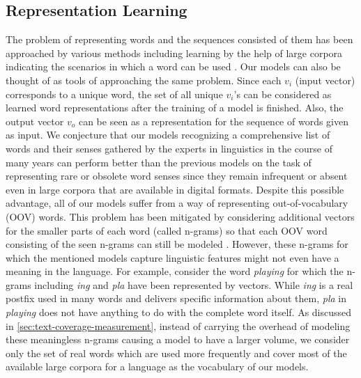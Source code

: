 \documentclass{article}
\begin{document}
\subsection{Representation Learning}
The problem of representing words and the sequences consisted of them has been approached by various methods including learning by the help of large corpora indicating the scenarios in which a word can be used \cite{Mikolov2013EfficientEO}. Our models can also be thought of as tools of approaching the same problem.
Since each $v_i$ (input vector) corresponds to a unique word, the set of all unique $v_i$'s can be considered as learned word representations after the training of a model is finished.
Also, the output vector $v_o$ can be seen as a representation for the sequence of words given as input.
We conjecture that our models recognizing a comprehensive list of words and their senses gathered by the experts in linguistics in the course of many years can perform better than the previous models on the task of representing rare or obsolete word senses since they remain infrequent or absent even in large corpora that are available in digital formats. Despite this possible advantage, all of our models suffer from a way of representing out-of-vocabulary (OOV) words. This problem has been mitigated by considering additional vectors for the smaller parts of each word (called n-grams) so that each OOV word consisting of the seen n-grams can still be modeled \cite{bojanowski-etal-2017-enriching,peters-etal-2018-deep,devlin-etal-2019-bert}. However, these n-grams for which the mentioned models capture linguistic features might not even have a meaning in the language. For example, consider the word \textit{playing} for which the n-grams including \textit{ing} and \textit{pla} have been represented by vectors. While \textit{ing} is a real postfix used in many words and delivers specific information about them, \textit{pla} in \textit{playing} does not have anything to do with the complete word itself. As discussed in \ref{sec:text-coverage-measurement}, instead of carrying the overhead of modeling these meaningless n-grams causing a model to have a larger volume, we consider only the set of real words which are used more frequently and cover most of the available large corpora for a language as the vocabulary of our models.
\end{document}
